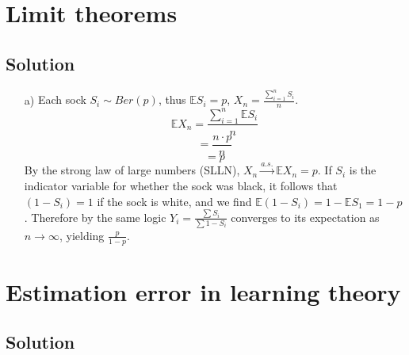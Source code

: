 \documentclass[10pt]{article}
\numberwithin{equation}{section}
\begin{document}
\section*{Limit theorems}

\subsection*{Solution}
\begin{enumerate}
  \item[a)]{
      Each sock $S_i \sim Ber(p)$, thus $\mathbb{E} S_i = p$, $X_n = \frac{\sum_{i=1}^n S_i}{n}$.
      $$\mathbb{E} X_n = \frac{\sum_{i=1}^n \mathbb{E} S_i}{n}$$
      $$= \frac{n \cdot p}{n}$$
      $$=p$$
      By the strong law of large numbers (SLLN), $X_n \overset{a.s.}{\rightarrow} \mathbb{E}X_n = p$.
      If $S_i$ is the indicator variable for whether the sock was black, it follows that $(1-S_i) = 1$ if the sock is white, and we find $\mathbb{E} (1-S_i) = 1-\mathbb{E} S_1 = 1-p$.
      Therefore by the same logic $Y_i = \frac{\sum S_i}{\sum 1-S_i}$ converges to its expectation as $n\rightarrow \infty$, yielding $\frac{p}{1-p}$.
    }
 
\end{enumerate}

\section*{Estimation error in learning theory}
\subsection*{Solution}
\end{document}
